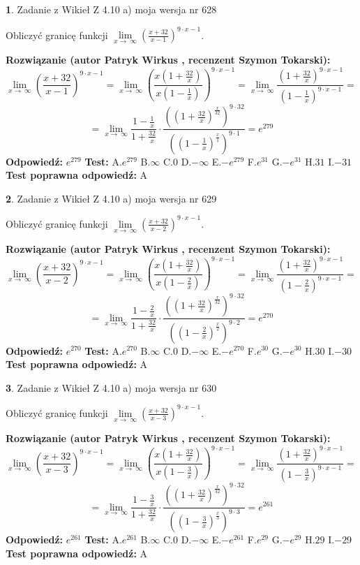 \documentclass[12pt, a4paper]{article}
\theoremstyle{definition} %
\newtheorem{zad}{}
\newcommand{\zadStart}[1]{\begin{zad}#1\newline}
\newcommand{\zadStop}{\end{zad}}
\newcommand{\rozwStart}[2]{\noindent \textbf{Rozwiązanie (autor #1 , recenzent #2): }\newline}
\newcommand{\rozwStop}{\newline}
\newcommand{\odpStart}{\noindent \textbf{Odpowiedź:}\newline}
\newcommand{\odpStop}{\newline}
\newcommand{\testStart}{\noindent \textbf{Test:}\newline}
\newcommand{\testStop}{\newline}
\newcommand{\kluczStart}{\noindent \textbf{Test poprawna odpowiedź:}\newline}
\newcommand{\kluczStop}{\newline}
\begin{document}
\zadStart{Zadanie z Wikieł Z 4.10 a) moja wersja nr 628}

Obliczyć granicę funkcji  $\lim\limits_{x\to\ \infty}(\frac{x+32}{x-1})^{9\cdot x-1}$.
\zadStop
\rozwStart{Patryk Wirkus}{Szymon Tokarski}
$$\lim\limits_{x\to\ \infty}(\frac{x+32}{x-1})^{9\cdot x-1} = \lim\limits_{x\to\ \infty}(\frac{x(1+\frac{32}{x})}{x(1-\frac{1}{x})})^{9\cdot x-1}=\lim\limits_{x\to\ \infty}\frac{(1+\frac{32}{x})^{9\cdot x-1}}{(1-\frac{1}{x})^{9\cdot x-1}}=$$
$$=\lim\limits_{x\to\ \infty}\frac{1-\frac{1}{x}}{1+\frac{32}{x}}\cdot\frac{((1+\frac{32}{x})^{\frac{x}{32}})^{9\cdot32}}{((1-\frac{1}{x})^{\frac{x}{1}})^{9\cdot1}}=e^{279}$$
\rozwStop
\odpStart
$e^{279}$
\odpStop
\testStart
A.$e^{279}$ B.$\infty$ C.$0$ D.$-\infty$ E.$-e^{279}$
F.$e^{31}$ G.$-e^{31}$
H.$31$
I.$-31$
\testStop
\kluczStart
A
\kluczStop



\zadStart{Zadanie z Wikieł Z 4.10 a) moja wersja nr 629}

Obliczyć granicę funkcji  $\lim\limits_{x\to\ \infty}(\frac{x+32}{x-2})^{9\cdot x-1}$.
\zadStop
\rozwStart{Patryk Wirkus}{Szymon Tokarski}
$$\lim\limits_{x\to\ \infty}(\frac{x+32}{x-2})^{9\cdot x-1} = \lim\limits_{x\to\ \infty}(\frac{x(1+\frac{32}{x})}{x(1-\frac{2}{x})})^{9\cdot x-1}=\lim\limits_{x\to\ \infty}\frac{(1+\frac{32}{x})^{9\cdot x-1}}{(1-\frac{2}{x})^{9\cdot x-1}}=$$
$$=\lim\limits_{x\to\ \infty}\frac{1-\frac{2}{x}}{1+\frac{32}{x}}\cdot\frac{((1+\frac{32}{x})^{\frac{x}{32}})^{9\cdot32}}{((1-\frac{2}{x})^{\frac{x}{2}})^{9\cdot2}}=e^{270}$$
\rozwStop
\odpStart
$e^{270}$
\odpStop
\testStart
A.$e^{270}$ B.$\infty$ C.$0$ D.$-\infty$ E.$-e^{270}$
F.$e^{30}$ G.$-e^{30}$
H.$30$
I.$-30$
\testStop
\kluczStart
A
\kluczStop



\zadStart{Zadanie z Wikieł Z 4.10 a) moja wersja nr 630}

Obliczyć granicę funkcji  $\lim\limits_{x\to\ \infty}(\frac{x+32}{x-3})^{9\cdot x-1}$.
\zadStop
\rozwStart{Patryk Wirkus}{Szymon Tokarski}
$$\lim\limits_{x\to\ \infty}(\frac{x+32}{x-3})^{9\cdot x-1} = \lim\limits_{x\to\ \infty}(\frac{x(1+\frac{32}{x})}{x(1-\frac{3}{x})})^{9\cdot x-1}=\lim\limits_{x\to\ \infty}\frac{(1+\frac{32}{x})^{9\cdot x-1}}{(1-\frac{3}{x})^{9\cdot x-1}}=$$
$$=\lim\limits_{x\to\ \infty}\frac{1-\frac{3}{x}}{1+\frac{32}{x}}\cdot\frac{((1+\frac{32}{x})^{\frac{x}{32}})^{9\cdot32}}{((1-\frac{3}{x})^{\frac{x}{3}})^{9\cdot3}}=e^{261}$$
\rozwStop
\odpStart
$e^{261}$
\odpStop
\testStart
A.$e^{261}$ B.$\infty$ C.$0$ D.$-\infty$ E.$-e^{261}$
F.$e^{29}$ G.$-e^{29}$
H.$29$
I.$-29$
\testStop
\kluczStart
A
\kluczStop
\end{document}
